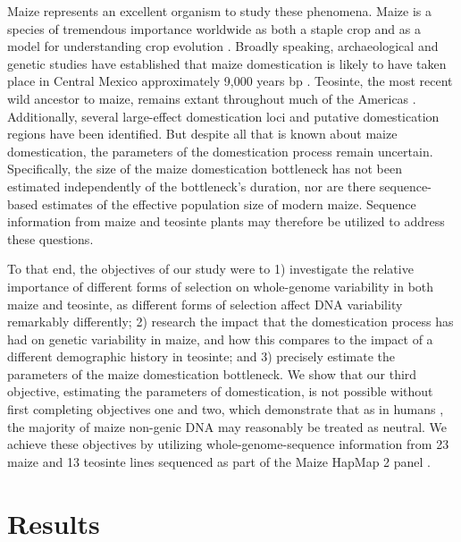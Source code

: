 \documentclass{pnastwo}
\begin{document}
\begin{article}
Maize represents an excellent organism to study these
phenomena. Maize is a species of tremendous importance worldwide as
both a staple crop \cite{SOMETHING} and as a model for
understanding crop evolution \cite{SOMETHINGS}. Broadly speaking, archaeological and genetic studies have
established that maize domestication is likely to have taken place in
Central Mexico approximately 9,000 years bp
\cite{SOMETHING,SOMETHING}. Teosinte, the most
recent wild ancestor to maize, remains extant throughout much of the
Americas \cite{SOMETHING}. Additionally, several large-effect
domestication loci \cite{SOMETHINGS} and putative domestication
regions \cite{hufford2012} have been identified. But despite all that is
known about maize domestication, the parameters of the
domestication process remain uncertain. Specifically, the size of the
maize domestication bottleneck has not been estimated independently of
the bottleneck's duration, nor are there sequence-based estimates of the effective
population size of modern maize. Sequence information from maize and
teosinte plants may therefore be utilized to address these questions.

To that end, the objectives of our study were to 1) investigate the
relative importance of different forms of selection on whole-genome
variability in both maize and teosinte, as different forms of selection affect DNA
variability remarkably differently; 2) research the impact that the
domestication process has had on genetic variability in maize, and how
this compares to the impact of a different demographic history in
teosinte; and 3) precisely estimate the parameters of the
maize domestication bottleneck. We show that our third objective, estimating the
parameters of domestication, is not possible without first completing
 objectives one and two, which demonstrate that as in humans \cite{gazave2014}, the
majority of maize non-genic DNA may reasonably be treated as
neutral. We achieve these objectives by utilizing
whole-genome-sequence information from 23 maize and 13 teosinte lines
sequenced as part of the Maize HapMap 2 panel \cite{chia2012}.


\section{Results}

\end{article}
\end{document}
